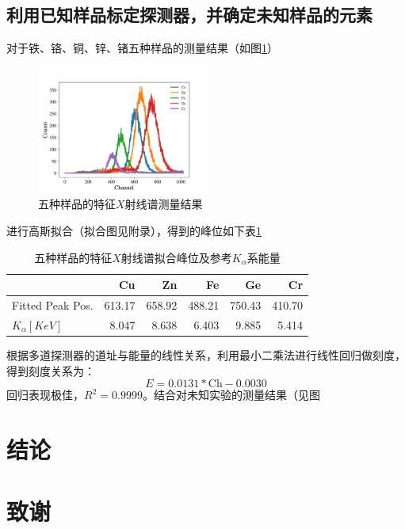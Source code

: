 \documentclass{article}
\begin{document}
    \subsection{利用已知样品标定探测器，并确定未知样品的元素}
    对于铁、铬、铜、锌、锗五种样品的测量结果（如图\ref{fig:Calibration}）
    \begin{figure}
        \centering
        \includegraphics[width=0.5\textwidth]{../plot/Calibration.pdf}
        \caption{五种样品的特征$X$射线谱测量结果\label{fig:Calibration}}
    \end{figure}
    进行高斯拟合（拟合图见附录），得到的峰位如下表\ref{tab:Calibration}
    \begin{table}[htbp]
        \centering
        \caption{五种样品的特征$X$射线谱拟合峰位及参考$K_\alpha$系能量\label{tab:Calibration}}
        \begin{tabular}{lrrrrr}
            \toprule
            {} &          Cu &          Zn &          Fe &          Ge &          Cr \\
            \midrule
            Fitted Peak Pos. &  613.17 &  658.92 &  488.21 &  750.43 &  410.70 \\
            $K_\alpha[\si{KeV}]$ &    8.047 &    8.638 &    6.403 &    9.885 &    5.414 \\
            \bottomrule
            \end{tabular}
    \end{table}
    根据多道探测器的道址与能量的线性关系，利用最小二乘法进行线性回归做刻度，得到刻度关系为：
    \begin{equation}
        E = 0.0131*\text{Ch} - 0.0030
    \end{equation}
    回归表现极佳，$R^2=0.9999$。结合对未知实验的测量结果（见图
    \section{结论}
    \section{致谢}
    \clearpage
    \appendix
    \appendixpage
\end{document}
